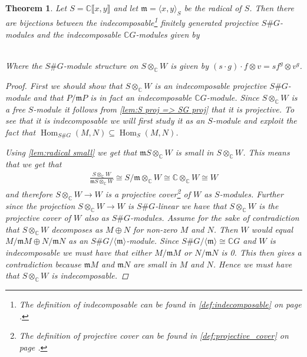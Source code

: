 \documentclass[11pt, a4paper, english]{article}
\numberwithin{prop}{section}
\numberwithin{lemma}{section}
\newtheorem{theorem}{Theorem}
\numberwithin{theorem}{section}
\numberwithin{defin}{section}
\numberwithin{example}{section}
\newcommand{\C}{\mathbb{C}}
\DeclareMathOperator{\Hom}{Hom}
\begin{document}
\begin{theorem}
\label{thm:indec_proj_SG=indec_CG}
Let $S = \C\llbracket x, y \rrbracket$ and let $\mathfrak{m} = \langle x, y \rangle_S$ be the radical of $S$. Then there are bijections between the indecomposable\footnote{The definition of indecomposable can be found in \cref{def:indecomposable} on page \pageref{def:indecomposable}.} finitely generated projective $S\#G$-modules and the indecomposable $\C G$-modules given by
\\
\\

Where the $S\#G$-module structure on $S \otimes_\C W$ is given by $(s \cdot g) \cdot f \otimes v = sf^g \otimes v^g$.

\begin{proof}
First we should show that $S \otimes_\C W$ is an indecomposable projective $S\#G$-module and that $P/\mathfrak{m}P$ is in fact an indecomposable $\C G$-module. Since $S \otimes_\C W$ is a free $S$-module it follows from \cref{lem:S proj => SG proj} that it is projective. To see that it is indecomposable we will first study it as an $S$-module and exploit the fact that $\Hom_{S\#G}(M,N) \subseteq \Hom_S(M,N)$. 

Using \cref{lem:radical small} we get that $\mathfrak{m}S \otimes_\C W$ is small in $S\otimes_\C W$. This means that we get that 
\begin{align*}
\frac{S \otimes_\C W}{\mathfrak{m}S \otimes_\C W} \cong S/\mathfrak{m} \otimes_\C W \cong \C \otimes_\C W \cong W
\end{align*}
and therefore $S \otimes_\C W \to W$ is a projective cover\footnote{The definition of projective cover can be found in \cref{def:projective_cover} on page \pageref{def:projective_cover}.} of $W$ as $S$-modules. Further since the projection $S \otimes_\C W \to W$ is $S\#G$-linear we have that $S \otimes_\C W$ is the projective cover of $W$ also as $S\#G$-modules. Assume for the sake of contradiction that $S \otimes_\C W$ decomposes as $M \oplus N$ for non-zero $M$ and $N$. Then $W$ would equal $M/\mathfrak{m}M \oplus N/\mathfrak{m}N$ as an $S\#G/ \langle \mathfrak{m} \rangle$-module. Since $S\#G/ \langle \mathfrak{m} \rangle \cong \C G$ and $W$ is indecomposable we must have that either $M/\mathfrak{m}M$ or $N/\mathfrak{m}N$ is 0. This then gives a contradiction because $\mathfrak{m}M$ and $\mathfrak{m}N$ are small in $M$ and $N$. Hence we must have that $S \otimes_\C W$ is indecomposable.


\end{proof}
\end{theorem}
\end{document}
